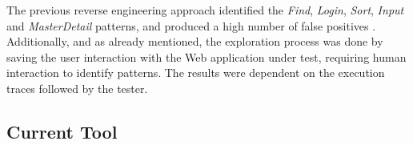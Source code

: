 \begin{center}
\begin{table}[!htb]
\caption{Abbreviated example of an execution trace file.}
\label{tab:exec}
\end{table}
\end{center}

The previous reverse engineering approach identified the \textit{Find}, \textit{Login}, \textit{Sort}, \textit{Input} and \textit{MasterDetail} patterns, and produced a high number of false positives \cite{nabuco2013inferring}. Additionally, and as already mentioned, the exploration process was done by saving the user interaction with the Web application under test, requiring human interaction to identify patterns. The results were dependent on the execution traces followed by the tester. \\

\subsection{Current Tool}

